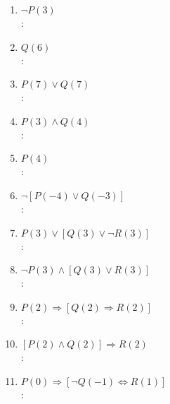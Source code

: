 \begin{enumerate}[label=0.1.\arabic*]
\begin{enumerate}[label=\arabic*)]
		\item $ \neg P(3) $ \\
		\solucion: \\
		
		\item $ Q(6) $ \\
		\solucion: \\
		
		\item $ P(7) \vee Q(7) $ \\
		\solucion: \\
		
		\item $ P(3) \wedge Q(4) $ \\
		\solucion: \\
		
		\item $ P(4) $ \\
		\solucion: \\
		
		\item $ \neg [P(-4) \vee Q(-3)] $ \\
		\solucion: \\
		
		\item $ P(3) \vee [Q(3) \vee \neg R(3)] $ \\
		\solucion: \\
		
		\item $ \neg P(3) \wedge [Q(3) \vee R(3)] $ \\
		\solucion: \\
		
		\item $ P(2) \Rightarrow [Q(2) \Rightarrow R(2)] $ \\
		\solucion: \\
		
		\item $ [P(2) \wedge Q(2)] \Rightarrow R(2) $ \\
		\solucion: \\
		
		\item $ P(0) \Rightarrow [\neg Q(-1) \Leftrightarrow R(1)] $ \\
		\solucion: \\
		

\end{enumerate}
\end{enumerate}
